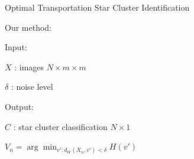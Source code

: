 \documentclass[10pt]{beamer}
\newcommand{\1}{{\mathbbm{1}}}
\begin{document}
\begin{frame}{Optimal Transportation Star Cluster Identification}

Our method: \pause

\begin{algorithm}[H]
    Input: 
    
    $X$ : images $N \times m \times m$

    $\delta$ : noise level \pause

    Output:
    
    $C$ : star cluster classification $N \times 1$ \pause

 	{
     	$ V_n = \arg\min_{v':d_W(X_n,v')<\delta} H(v')$ \pause
     	
  	}
	\caption{Optimal Transportation Star Cluster Identification}
\end{algorithm}

\end{frame}
\end{document}
